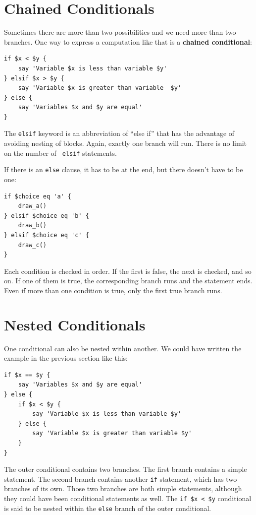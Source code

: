 \section{Chained Conditionals}

Sometimes there are more than two possibilities and we need more than
two branches.  One way to express a computation like that is a 
{\bf chained conditional}:

\begin{verbatim}
if $x < $y {
    say 'Variable $x is less than variable $y'
} elsif $x > $y {
    say 'Variable $x is greater than variable  $y' 
} else {
    say 'Variables $x and $y are equal'
}
\end{verbatim}
%
The {\tt elsif} keyword is an abbreviation of ``else if'' that 
has the advantage of avoiding nesting of blocks. Again, exactly one
branch will run.  There is no limit on the number of {\tt
elsif} statements.  

If there is an {\tt else} clause, it has to be
at the end, but there doesn't have to be one:

\begin{verbatim}
if $choice eq 'a' {
    draw_a()
} elsif $choice eq 'b' {
    draw_b()
} elsif $choice eq 'c' {
    draw_c()
}
\end{verbatim}
%
Each condition is checked in order.  If the first is false,
the next is checked, and so on.  If one of them is
true, the corresponding branch runs and the statement
ends.  Even if more than one condition is true, only the
first true branch runs.


\section{Nested Conditionals}

One conditional can also be nested within another.  We could have
written the example in the previous section like this:

\begin{verbatim}
if $x == $y {
    say 'Variables $x and $y are equal'
} else {
    if $x < $y {
        say 'Variable $x is less than variable $y'
    } else {
        say 'Variable $x is greater than variable $y'
    }
}
\end{verbatim}
%
The outer conditional contains two branches.  The
first branch contains a simple statement.  The second branch
contains another {\tt if} statement, which has two branches of its
own.  Those two branches are both simple statements,
although they could have been conditional statements as well. 
The \verb'if $x < $y' conditional is said to be nested within 
the {\tt else} branch of the outer conditional.


